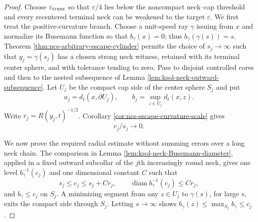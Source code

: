 \documentclass[10pt]{coll-l}
\theoremstyle{definition}
\theoremstyle{remark}
\numberwithin{section}{chapter}
\numberwithin{equation}{chapter}
\begin{document}
\begin{proof}
Choose $\varepsilon_{\rm trunc}$ so that $\varepsilon/4$ lies below the
noncompact neck--cap threshold and every recentered terminal neck can be
weakened to the target $\varepsilon$.
We first treat the positive-curvature branch.  Choose a unit-speed ray
$\gamma$ issuing from $x$ and normalize its Busemann function so that
$b_\gamma(x)=0$; thus $b_\gamma(\gamma(s))=s$.  Theorem
\ref{thm:ncs-arbitrary-escape-cylinder} permits the choice of
$s_j\to\infty$ such that $y_j=\gamma(s_j)$ has a chosen strong neck
witness, retained with its terminal center sphere, and with tolerance
tending to zero.  Pass to disjoint controlled cores and then to
the nested subsequence of Lemma
\ref{lem:ksol-neck-outward-subsequence}.  Let $U_j$ be the compact cap side
of the center sphere $S_j$ and put
\begin{equation}
 a_j=d_t(x,\partial U_j),\qquad
 b_j=\sup_{z\in U_j}d_t(x,z).                          \label{eq:ncs-cap-inner-outer-radii}
\end{equation}
Write $r_j=R(y_j,t)^{-1/2}$.  Corollary
\ref{cor:ncs-escape-curvature-scale} gives
\begin{equation}
                         r_j/s_j\longrightarrow0.      \label{eq:ncs-cap-neck-radius-little-o}
\end{equation}

We now prove the required radial estimate without summing errors over a
long neck chain.  The comparison in Lemma
\ref{lem:ksol-neck-Busemann-diameter}, applied in a fixed outward
subcollar of the $j$th increasingly round neck, gives one level
$b_\gamma^{-1}(c_j)$ and one dimensional constant $C$ such that
\begin{equation}
 s_j\leq c_j\leq s_j+Cr_j,\qquad
 \operatorname{diam}b_\gamma^{-1}(c_j)\leq Cr_j,       \label{eq:ncs-cap-outer-level-control}
\end{equation}
and $b_\gamma\leq c_j$ on $S_j$.  A minimizing segment from any
$z\in U_j$ to $\gamma(s)$, for large $s$, exits the compact side through
$S_j$.  Letting $s\to\infty$ shows
$b_\gamma(z)\leq\max_{S_j}b_\gamma\leq c_j$.


\end{proof}
\end{document}
